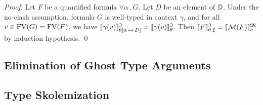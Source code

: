 \begin{proof}
Let $F$ be a quantified formula $\forall \alpha \,.\, G$.
Let $D$ be an element of $\mathbb{D}$. Under the no-clash assumption,
formula $G$ is well-typed in context $\gamma$, and for all
$v \in \mathrm{FV}(G) = \mathrm{FV}(F)$, we have
$\llbracket\gamma(v)\rrbracket^{\mathfrak{I}}_{\theta[\alpha\,\mapsto\,D]} = \llbracket\gamma(v)\rrbracket^{\mathfrak{I}}_{\theta}$.
Then $\llbracket F\rrbracket^{\mathfrak{I}}_{\theta,\xi} = \llbracket \mathcal{M}(F) \rrbracket^{\mathfrak{M}}_{\nu}$ by induction hypothesis.
\qed
\end{proof}

\subsection{Elimination of Ghost Type Arguments} \label{ssec:ghost}
\subsection{Type Skolemization} \label{ssec:skol}


